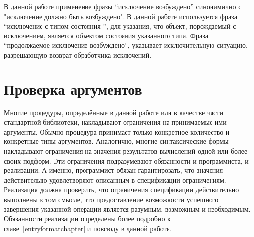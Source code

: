 В данной работе применение фразы ``исключение возбуждено'' синонимично с "исключение должно быть
возбуждено". В данной работе используется фраза ``исключение с типом состояния '', для указания,
что объект, порождаемый с исключением, является объектом состояния указанного типа. Фраза
``продолжаемое исключение возбуждено'', указывает исключительную ситуацию, разрешающую возврат обработчика
исключений.

\section{Проверка аргументов}
\label{argumentcheckingsection}

Многие процедуры, определённые в данной работе или в качестве части стандартной библиотеки,
накладывают ограничения на принимаемые ими аргументы. Обычно процедура принимает только
конкретное количество и конкретные типы аргументов. Аналогично, многие синтаксические формы
накладывают ограничения на значения результатов вычислений одной или более своих подформ. Эти
ограничения подразумевают обязанности и программиста, и реализации. А
именно, программист обязан гарантировать, что значения действительно удовлетворяют описанным в
спецификации ограничениям. Реализация должна проверить, что ограничения спецификации
действительно выполнены в том смысле, что предоставление возможности успешного завершения
указанной операции является разумным, возможным и необходимым. Обязанности реализации определены
более подробно в главе~\ref{entryformatchapter} и повсюду в данной работе.


